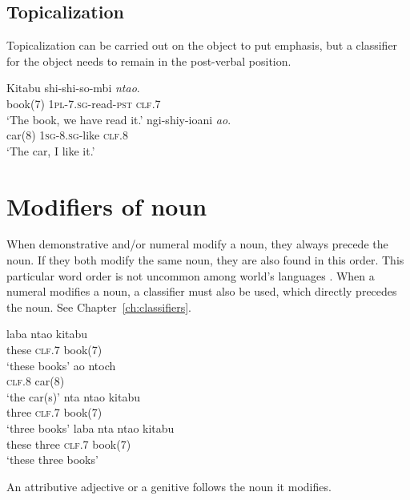 \subsection{Topicalization}
Topicalization can be carried out on the object to put emphasis, but a classifier for the object needs to remain in the post-verbal position.

\begin{exe}
\ex
\gll Kitabu shi-shi-so-mbi \textit{nta\textbeltl o}. \\
book(7) \textsc{1pl}-\textsc{7.sg}-read-\textsc{pst} \textsc{clf}.7 \\
\trans `The book, we have read it.'
\ex
{} ngi-shiy-ioani \textit{a\textlyoghlig o}. \\
car(8) \textsc{1sg}-\textsc{8.sg}-like \textsc{clf}.8 \\
\trans `The car, I like it.'
\end{exe}

\section{Modifiers of noun}

When demonstrative and/or numeral modify a noun, they always precede the noun. If they both modify the same noun, they are also found in this order. This particular word order is not uncommon among world's languages \cite{Greenberg-1963}. When a numeral modifies a noun, a classifier must also be used, which directly precedes the noun. See Chapter~\ref{ch:classifiers}.

\begin{exe}
\ex
\gll laba nta\textbeltl o kitabu \\
these \textsc{clf.7} book(7) \\
\trans `these books'
\ex
\gll a\textlyoghlig o {ntoch\textramshorns} \\
\textsc{clf.8} car(8) \\
\trans `the car(s)'
\ex
\gll nta nta\textbeltl o kitabu \\
three \textsc{clf.7} book(7) \\
\trans `three books'
\ex
\gll laba nta nta\textbeltl o kitabu \\
these three \textsc{clf.7} book(7) \\
\trans `these three books'
\end{exe}

An attributive adjective or a genitive follows the noun it modifies.

